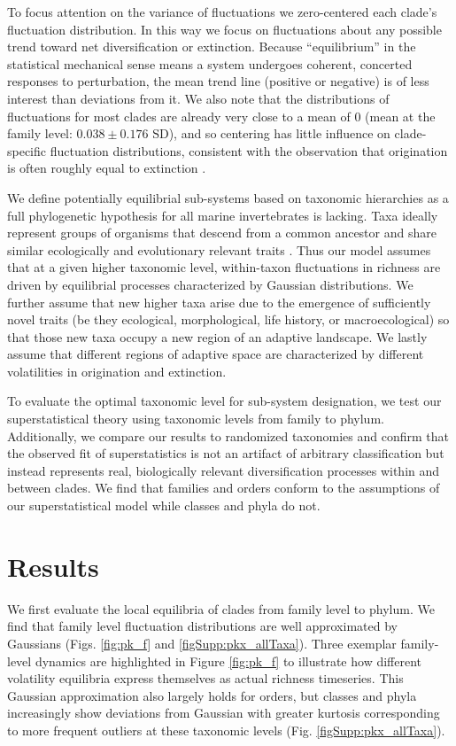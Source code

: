 \documentclass[12pt]{article}
\let\citep=\cite
\begin{document}
To focus attention on the variance of fluctuations we zero-centered
each clade's fluctuation distribution. In this way we focus on
fluctuations about any possible trend toward net diversification or
extinction. Because ``equilibrium'' in the statistical mechanical
sense means a system undergoes coherent, concerted responses to
perturbation, the mean trend line (positive or negative) is of less
interest than deviations from it. We also note that the distributions
of fluctuations for most clades are already very close to a mean of 0
(mean at the family level: $0.038 \pm 0.176 \text{ SD}$), and so
centering has little influence on clade-specific fluctuation
distributions, consistent with the observation that origination is
often roughly equal to extinction \citep{foote2010Chapter}.

We define potentially equilibrial sub-systems based on taxonomic
hierarchies as a full phylogenetic hypothesis for all marine
invertebrates is lacking.  Taxa ideally represent groups of organisms
that descend from a common ancestor and share similar ecologically and
evolutionary relevant traits \citep{mayr1965systZool, erwin2007,
  ezard2016}. Thus our model assumes that at a given higher taxonomic
level, within-taxon fluctuations in richness are driven by
equilibrial processes characterized by Gaussian distributions. We
further assume that new higher taxa arise due to the emergence of
sufficiently novel traits (be they ecological, morphological, life
history, or macroecological) so that those new taxa occupy a new
region of an adaptive landscape. We lastly assume that different
regions of adaptive space are characterized by different volatilities
in origination and extinction.

To evaluate the optimal taxonomic level for sub-system designation, we
test our superstatistical theory using taxonomic levels from family to
phylum. Additionally, we compare our results to randomized taxonomies
and confirm that the observed fit of superstatistics is not an
artifact of arbitrary classification but instead represents real,
biologically relevant diversification processes within and between
clades. We find that families and orders conform to the assumptions of
our superstatistical model while classes and phyla do not.

\section{Results}

We first evaluate the local equilibria of clades from family level to
phylum. We find that family level fluctuation distributions are well
approximated by Gaussians (Figs. \ref{fig:pk_f} and
\ref{figSupp:pkx_allTaxa}).  Three exemplar family-level dynamics are
highlighted in Figure \ref{fig:pk_f} to illustrate how different
volatility equilibria express themselves as actual richness
timeseries.  This Gaussian approximation also largely holds for
orders, but classes and phyla increasingly show deviations from
Gaussian with greater kurtosis corresponding to more frequent outliers
at these taxonomic levels (Fig. \ref{figSupp:pkx_allTaxa}).
\end{document}
